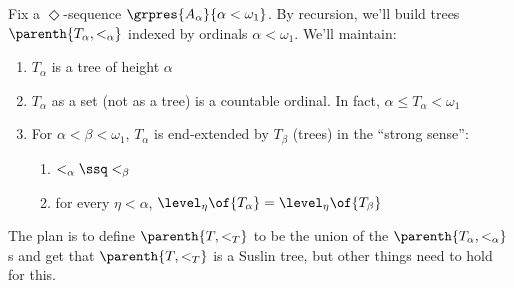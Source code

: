 \begin{boxconstruction}
    Fix a $\Diamond$-sequence $\grpres{A_{\alpha}}{\alpha < \omega_1}$. By recursion, we'll build trees $\parenth{T_{\alpha}, <_{\alpha}}$ indexed by ordinals $\alpha < \omega_1$. We'll maintain:
    \begin{enumerate}
        \item $T_{\alpha}$ is a tree of height $\alpha$
        \item $T_{\alpha}$ as a set (not as a tree) is a countable ordinal. In fact, $\alpha \leq T_{\alpha} < \omega_1$
        \item For $\alpha < \beta < \omega_1$, $T_{\alpha}$ is end-extended by $T_{\beta}$ (trees) in the ``strong sense'':
        \begin{enumerate}
            \item $<_{\alpha} \ssq <_{\beta}$
            \item for every $\eta < \alpha$, $\level_{\eta}\of{T_{\alpha}} = \level_{\eta}\of{T_{\beta}}$
        \end{enumerate}
    \end{enumerate}
    The plan is to define $\parenth{T, <_T}$ to be the union of the $\parenth{T_{\alpha}, <_{\alpha}}$s and get that $\parenth{T, <_T}$ is a Suslin tree, but other things need to hold for this. \\


\end{boxconstruction}
